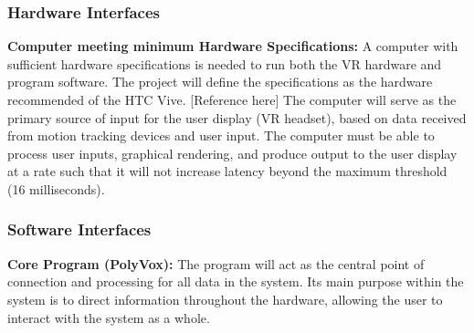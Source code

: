 \documentclass[onecolumn, draftclsnofoot,10pt, compsoc]{IEEEtran}
\begin{document}
\subsubsection{Hardware Interfaces}
\textbf{Computer meeting minimum Hardware Specifications:}
A computer with sufficient hardware specifications is needed to run both the VR hardware and program software. The project will define the specifications as the hardware recommended of the HTC Vive. [Reference here] The computer will serve as the primary source of input for the user display (VR headset), based on data received from motion tracking devices and user input. The computer must be able to process user inputs, graphical rendering, and produce output to the user display at a rate such that it will not increase latency beyond the maximum threshold (16 milliseconds).
\subsubsection{Software Interfaces}
\textbf{Core Program (PolyVox):}
\newline
The program will act as the central point of connection and processing for all data in the system. Its main purpose within the system is to direct information throughout the hardware, allowing the user to interact with the system as a whole.
\end{document}
